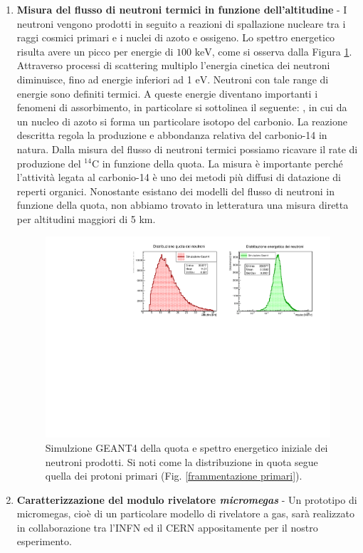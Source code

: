 \begin{enumerate}
    \item \textbf{Misura del flusso di neutroni termici in funzione dell'altitudine} - I neutroni vengono prodotti in seguito a reazioni di spallazione nucleare tra i raggi cosmici primari e i nuclei di azoto e ossigeno. Lo spettro energetico risulta avere un picco per energie di $100\text{ keV}$, come si osserva dalla Figura \ref{Neutroni}. Attraverso processi di scattering multiplo l'energia cinetica dei neutroni diminuisce, fino ad energie inferiori ad 1 $\text{eV}$. Neutroni con tale range di energie sono definiti termici. A queste energie diventano importanti i fenomeni di assorbimento, in particolare si sottolinea il seguente:
, in cui da un nucleo di azoto si forma un particolare isotopo del carbonio. La reazione descritta regola la produzione e abbondanza relativa del carbonio-14 in natura. Dalla misura del flusso di neutroni termici possiamo ricavare il rate di produzione del $^{14}\text{C}$ in funzione della quota.
La misura è importante perché l'attività legata al carbonio-14 è uno dei metodi più diffusi di datazione di reperti organici. Nonostante esistano dei modelli del flusso di neutroni in funzione della quota, non abbiamo trovato in letteratura una misura diretta per altitudini maggiori di 5 km.

\begin{figure}
    \centering
    \includegraphics[width=.9\linewidth]{Neutroni.pdf}
    \caption{Simulzione GEANT4 della quota e spettro energetico iniziale dei neutroni prodotti. Si noti come la distribuzione in quota segue quella dei protoni primari (Fig. \ref{frammentazione primari}).}
    \label{Neutroni}
\end{figure}
    \item \textbf{Caratterizzazione del modulo rivelatore \emph{micromegas}} - Un prototipo di micromegas, cioè di un particolare modello di rivelatore a gas, sarà realizzato in collaborazione tra l'INFN ed il CERN appositamente per il nostro esperimento.


\end{enumerate}

